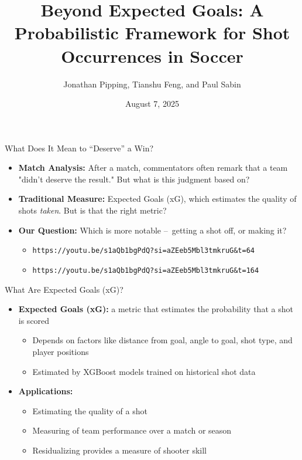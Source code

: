 \documentclass{beamer}
\title[Beyond Expected Goals]{Beyond Expected Goals: A Probabilistic Framework for Shot Occurrences in Soccer}
\author[Pipping, Feng, \& Sabin]{Jonathan Pipping, Tianshu Feng, and Paul Sabin}
\date{August 7, 2025}
\institute[UPenn]{University of Pennsylvania}
\begin{document}
\frame{\titlepage}

\begin{frame}[fragile]{What Does It Mean to ``Deserve'' a Win?}
\begin{itemize}
\item \textbf{Match Analysis:} After a match, commentators often remark that a team "didn't deserve the result." But what is this judgment based on?
\item \textbf{Traditional Measure:} Expected Goals (xG), which estimates the quality of shots \emph{taken}. But is that the right metric?
\item \textbf{Our Question:} Which is more notable – getting a shot off, or making it?
  \begin{itemize}
  \item \verb|https://youtu.be/s1aQb1bgPdQ?si=aZEeb5Mbl3tmkruG&t=64|
  \item \verb|https://youtu.be/s1aQb1bgPdQ?si=aZEeb5Mbl3tmkruG&t=164|
  \end{itemize}
\end{itemize}
\end{frame}

\begin{frame}{What Are Expected Goals (xG)?}
\begin{itemize}
\item \textbf{Expected Goals (xG):} a metric that estimates the probability that a shot is scored
\begin{itemize}
  \item Depends on factors like distance from goal, angle to goal, shot type, and player positions
  \item Estimated by XGBoost models trained on historical shot data
\end{itemize}
\item  \textbf{Applications:}
  \begin{itemize}
  \item Estimating the quality of a shot
  \item Measuring of team performance over a match or season
  \item Residualizing provides a measure of shooter skill
  \end{itemize}
\end{itemize}
\end{frame}
\end{document}
